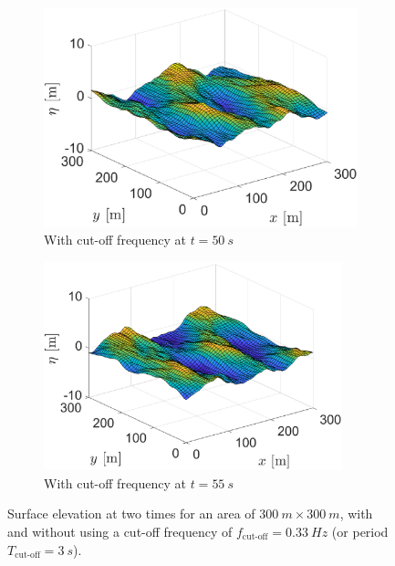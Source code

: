\begin{figure}[htb]
\begin{subfigure}[t]{.5\textwidth}
    \includegraphics[width=.95\textwidth,trim=0cm 0cm 0.0cm 0cm, clip=true]{Figures/Plots/etadir1.eps}
    \caption{With cut-off frequency at $t=\SI{50}{s}$}
    \label{fig:etaIFFTdir1}
\end{subfigure}%
\begin{subfigure}[t]{.5\textwidth}
    \centering
    \includegraphics[width=0.95\textwidth,trim=0cm 0cm 0cm 0cm, clip=true]{Figures/Plots/etadir2.eps}
    \caption{With cut-off frequency at $t=\SI{55}{s}$}
    \label{fig:etaIFFTdir2}
\end{subfigure}
\caption{Surface elevation at two times for an area of $\SI{300}{m}\times\SI{300}{m}$, with and without using a cut-off frequency of $f_{\text{cut-off}}=\SI{0.33}{Hz}$ (or period $T_{\text{cut-off}}=\SI{3}{s}$).}
\label{fig:etaIFFTdirection}
\end{figure}